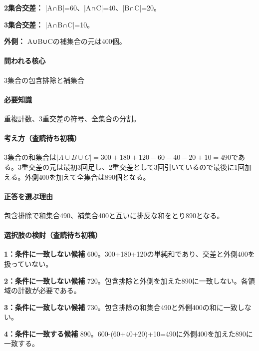 \noindent\textbf{2集合交差：} |A∩B|=60、|A∩C|=40、|B∩C|=20。\par

\noindent\textbf{3集合交差：} |A∩B∩C|=10。\par

\noindent\textbf{外側：} A∪B∪Cの補集合の元は400個。\par

\paragraph{問われる核心} 3集合の包含排除と補集合

\paragraph{必要知識} 重複計数、3重交差の符号、全集合の分割。

\paragraph{考え方（査読待ち初稿）} 3集合の和集合は\(|A\cup B\cup C|=300+180+120-60-40-20+10=490\)である。3重交差の元は最初3回足し、2重交差として3回引いているので最後に1回加える。外側400を加えて全集合は890個となる。

\paragraph{正答を選ぶ理由} 包含排除で和集合490、補集合400と互いに排反な和をとり890となる。

\paragraph{選択肢の検討（査読待ち初稿）}\mbox{}\par

\noindent\textbf{1：条件に一致しない候補} 600。300+180+120の単純和であり、交差と外側400を扱っていない。\par

\noindent\textbf{2：条件に一致しない候補} 720。包含排除と外側を加えた890に一致しない。各領域の計数が必要である。\par

\noindent\textbf{3：条件に一致しない候補} 730。包含排除の和集合490と外側400の和に一致しない。\par

\noindent\textbf{4：条件に一致する候補} 890。600-(60+40+20)+10=\allowbreak{}490に外側400を加えた890に一致する。\par

